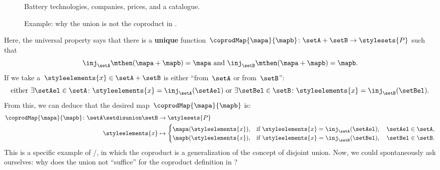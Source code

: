 \begin{example}
	\begin{figure*}[tbh]
		\centering
		\caption{Battery technologies, companies, prices, and a catalogue.}
		\label{fig:coprod_batteries_1}
	\end{figure*}

	\begin{figure*}[tbh]
		\centering
		\caption{Example: why the union is not the coproduct in \Set.}
		\label{fig:coprod_batteries_2}
	\end{figure*}

	Here, the universal property says that there is a \textbf{unique} function~$\coprodMap{\mapa}{\mapb}\colon \setA+\setB\to \stylesets{P}$ such that
	\begin{equation}
		\label{eq:exa-batt-factoring-maps}
		\inj_\setA\mthen (\mapa+ \mapb)=\mapa \text{ and }\inj_\setB\mthen (\mapa+ \mapb)=\mapb.
	\end{equation}
	If we take a~$\styleelements{x}\in \setA+\setB$ is either ``from~$\setA$ or from~$\setB$'':
	\begin{equation}
		\label{eq:exa-batt-explain-sum-map}
		\text{either } \exists \setAel\in \setA\colon \styleelements{x}=\inj_\setA(\setAel) \text{ or }\exists \setBel\in \setB\colon \styleelements{x}=\inj_\setB(\setBel).
	\end{equation}
	From this, we can deduce that the desired map~$\coprodMap{\mapa}{\mapb}$ is:
	\begin{equation}
		\label{eq:exa-batt-def-sum-map}
		\begin{aligned}
			\coprodMap{\mapa}{\mapb} \colon  \setA \setdisunion \setB & \to \stylesets{P} \\
			\styleelements{x}                              & \mapsto
			\begin{cases}
				\mapa(\styleelements{x}), & \text{if } \styleelements{x}=\inj_\setA(\setAel),\quad \setAel \in \setA, \\
				\mapb(\styleelements{x}), & \text{if } \styleelements{x}=\inj_\setB(\setBel),\quad \setBel \in \setB.
			\end{cases}
		\end{aligned}
	\end{equation}
	This is a specific example of \Set/\FinSet, in which the coproduct is a generalization of the concept of disjoint union.
	Now, we could spontaneously ask ourselves: why does the union not ``suffice'' for the coproduct definition in \Set?

\end{example}
